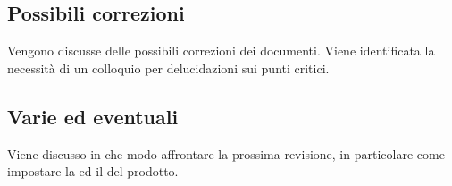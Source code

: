 \subsection*{Possibili correzioni}
Vengono discusse delle possibili correzioni dei documenti. Viene identificata la necessità di un colloquio per delucidazioni sui punti critici.
\subsection*{Varie ed eventuali}
Viene discusso in che modo affrontare la prossima revisione, in particolare come impostare la  ed il  del prodotto.
